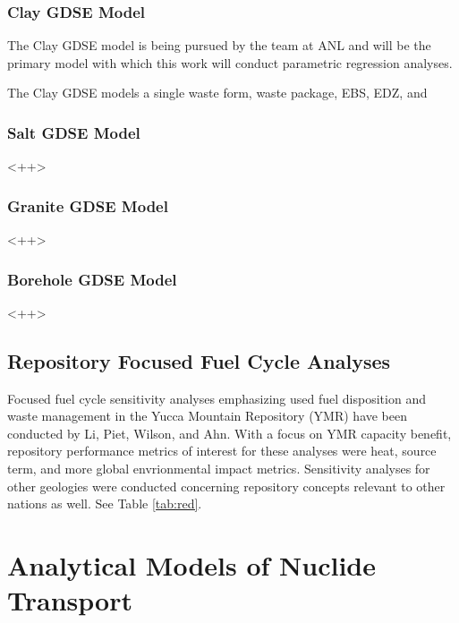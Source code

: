 \subsubsection{Clay GDSE Model}

The Clay \gls{GDSE} model is being pursued by the team at \gls{ANL} and will be 
the primary model with which this work will conduct parametric regression 
analyses. 

The Clay \gls{GDSE} models a single waste form, waste package, \gls{EBS}, 
\gls{EDZ}, and 

\subsubsection{Salt GDSE Model}

<++>


\subsubsection{Granite GDSE Model}

<++>

\subsubsection{ Borehole GDSE Model}


<++>

\subsection{Repository Focused Fuel Cycle Analyses}

Focused fuel cycle sensitivity analyses emphasizing used fuel disposition and
waste management in the Yucca Mountain Repository (YMR) have been conducted by
Li, Piet, Wilson, and Ahn. With a focus on YMR capacity benefit, repository
performance metrics of interest for these analyses were heat, source term, and
more global envrionmental impact metrics.  Sensitivity analyses for other
geologies were conducted concerning repository concepts relevant to other
nations as well. See Table \ref{tab:red}.

\section{Analytical Models of Nuclide Transport} \label{sec:analytical_nuc}


